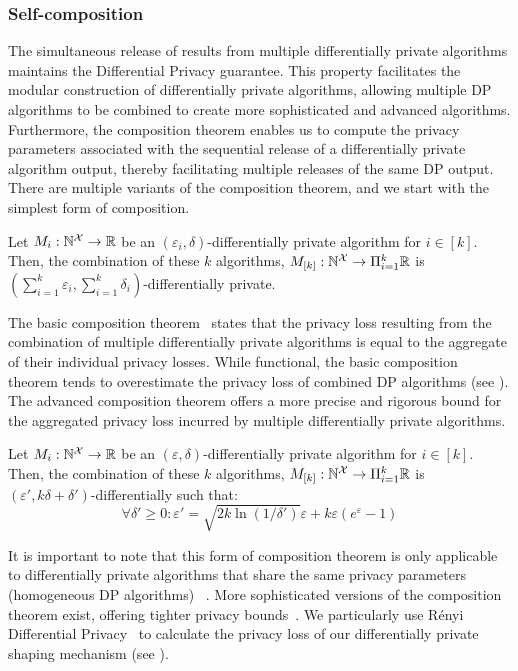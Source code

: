\subsubsection{Self-composition}\label{subsubsec:background-dp-composition}
The simultaneous release of results from multiple differentially private algorithms maintains the Differential Privacy guarantee.
This property facilitates the modular construction of differentially private algorithms, allowing multiple DP algorithms to be combined to create more sophisticated and advanced algorithms.
Furthermore, the composition theorem enables us to compute the privacy parameters associated with the sequential release of a differentially private algorithm output, thereby facilitating multiple releases of the same DP output.
There are multiple variants of the composition theorem, and we start with the simplest form of composition.
\begin{proposition}
\label{prop:basic-composition}
  Let $M_i: \mathbb{N}^\mathcal{X} \rightarrow \mathbb{R}$ be an $(\varepsilon_i, \delta)$-differentially private algorithm for $i \in [k]$. Then, the combination of these $k$ algorithms, $M_{[k]}: \mathbb{N}^\mathcal{X} \rightarrow \Pi_{i=1}^{k}\mathbb{R}$ is $(\sum_{i=1}^{k}\varepsilon_i, \sum_{i=1}^{k}\delta_i)$-differentially private.  
\end{proposition}
The basic composition theorem~\cite{dwork2014algorithmic} states that the privacy loss resulting from the combination of multiple differentially private algorithms is equal to the aggregate of their individual privacy losses.
While functional, the basic composition theorem tends to overestimate the privacy loss of combined DP algorithms (see ).
The advanced composition theorem offers a more precise and rigorous bound for the aggregated privacy loss incurred by multiple differentially private algorithms. 
\begin{proposition}
\label{prop:advanced-composition}
  Let $M_i: \mathbb{N}^\mathcal{X} \rightarrow \mathbb{R}$ be an $(\varepsilon, \delta)$-differentially private algorithm for $i \in [k]$. Then, the combination of these $k$ algorithms, $M_{[k]}: \mathbb{N}^\mathcal{X} \rightarrow \Pi_{i=1}^{k}\mathbb{R}$ is $(\varepsilon', k\delta+\delta')$-differentially such that:
  \begin{equation*}
    \forall \delta' \geq 0: \varepsilon' = \sqrt{2k\ln(1/\delta')}\varepsilon + k\varepsilon(e^{\varepsilon} - 1)
  \end{equation*}
\end{proposition}
It is important to note that this form of composition theorem is only applicable to differentially private algorithms that share the same privacy parameters (\ie homogeneous DP algorithms) ~\cite{mironov2017renyi}.
More sophisticated versions of the composition theorem exist, offering tighter privacy bounds~\cite{kairouz2015composition, mironov2017renyi}.
We particularly use R{\'e}nyi Differential Privacy~\cite{mironov2017renyi} to calculate the privacy loss of our differentially private shaping mechanism (see ).


